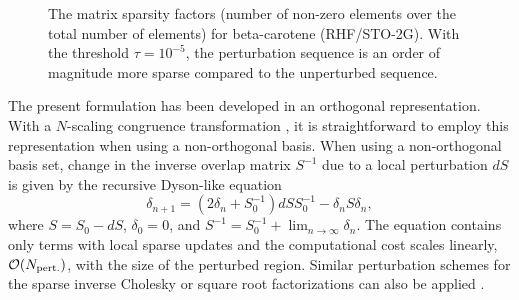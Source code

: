 \documentclass[prl,aps,twocolumn,showpacs,twocolumngrid,superbib]{revtex4}
\begin{document}
\begin{figure}[t]
\caption{\small  The matrix sparsity factors (number of non-zero elements 
over the total number of elements) for beta-carotene (RHF/STO-2G). With the 
threshold $\tau = 10^{-5}$, the perturbation sequence is an order
of magnitude more sparse compared to the unperturbed sequence.
\label{BetaC}}
\end{figure}

The present formulation has been developed in an orthogonal representation.  With 
a $N$-scaling congruence transformation \cite{Challa99},  it is straightforward to 
employ this representation when using a non-orthogonal basis. When using a 
non-orthogonal basis set, change in the inverse overlap matrix  $S^{-1}$  due to
a local perturbation $dS$ is given by the recursive Dyson-like equation \cite{unpubl} 
\begin{equation}
\delta_{n+1} = (2\delta_n +  S_0^{-1}) dS S_0^{-1}
 - \delta_n S \delta_n,
\end{equation}
where $S = S_0 - dS$, $\delta_0 = 0$, and
$S^{-1} = S_0^{-1}+\lim_{n \rightarrow \infty} \delta_n$.
The equation contains only terms with local sparse updates 
and the computational cost scales linearly, ${\cal O}(N_{\rm pert.})$,
with the size of the perturbed region. Similar perturbation schemes 
for the sparse inverse Cholesky or square root factorizations can also 
be applied \cite{unpubl}.
\end{document}
